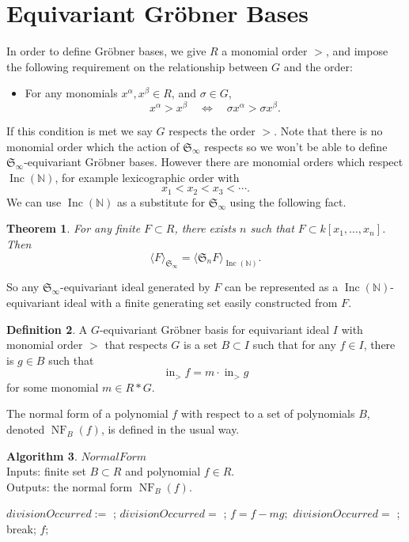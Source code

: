 \documentclass{amsart}
\newtheorem{theorem}{Theorem}[section]
\theoremstyle{definition}
\newtheorem{definition}[theorem]{Definition}
\newtheorem{algorithm}[theorem]{Algorithm}
\theoremstyle{remark}
\numberwithin{equation}{section}
\newcommand{\B}[1]{\mathbb #1}
\newcommand{\F}[1]{\mathfrak #1}
\newcommand{\<}{\langle}
\renewcommand{\>}{\rangle}
\newcommand{\ideal}[1]{\langle #1 \rangle}
\newcommand{\LT}{\operatorname{in}_>}
\newcommand{\Inc}{\operatorname{Inc}(\B N)}
\newcommand{\NF}{\operatorname{NF}}
\begin{document}
\section{Equivariant Gr\"obner Bases}
In order to define Gr\"obner bases, we give $R$ a monomial order $>$, and impose the following requirement on the relationship between $G$ and the order:
\begin{itemize}
 \item For any monomials $x^\alpha, x^\beta \in R$, and $\sigma \in G$,
\[ x^\alpha > x^\beta \quad \Leftrightarrow \quad \sigma x^\alpha > \sigma x^\beta. \]
\end{itemize}
If this condition is met we say $G$ respects the order $>$.
Note that there is no monomial order which the action of $\F S_\infty$ respects so we won't be able to define $\F S_\infty$-equivariant Gr\"obner bases.  However there are monomial orders which respect $\Inc$, for example lexicographic order with
\[x_1 < x_2 < x_3 < \cdots.\]
We can use $\Inc$ as a substitute for $\F S_\infty$ using the following fact.
\begin{theorem}
For any finite $F \subset R$, there exists $n$ such that $F \subset k[x_1,\ldots,x_n]$.  Then
 \[ \ideal{F}_{\F S_\infty} = \ideal{\F S_n F}_{\Inc}. \]
\end{theorem}
So any $\F S_\infty$-equivariant ideal generated by $F$ can be represented as a $\Inc$-equivariant ideal with a finite generating set easily constructed from $F$.


\begin{definition}
 A $G$-equivariant Gr\"obner basis for equivariant ideal $I$ with monomial order $>$ that respects $G$ is a set $B \subset I$ such that for any $f \in I$, there is $g \in B$ such that
  \[ \LT f = m\cdot \LT g \]
 for some monomial $m \in R*G$. 
\end{definition}

The normal form of a polynomial $f$ with respect to a set of polynomials $B$, denoted $\NF_B(f)$, is defined in the usual way.
\begin{algorithm}
$NormalForm$ \\
Inputs: finite set $B \subset R$ and polynomial $f \in R$.\\
Outputs: the normal form $\NF_B(f)$.
\begin{algorithmic}
\STATE $divisionOccurred :=$ \TRUE ;
	\STATE $divisionOccurred =$ \FALSE ;
		\IF{there is $m \in R*G$ such that $\LT f = m \LT g$}
			\STATE $f = f - mg;$
			\STATE $divisionOccurred =$ \TRUE ;
			\STATE break;
		\ENDIF
	\ENDFOR
\ENDWHILE
\RETURN $f;$
\end{algorithmic}
\end{algorithm}
\end{document}
